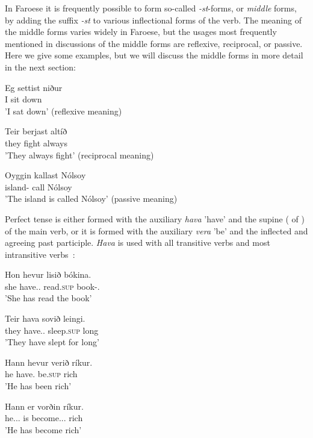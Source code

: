 \documentclass[12pt,%
]{lin-v2/lin}
\begin{document}
In Faroese it is frequently possible to form so-called \emph{-st}-forms, or \emph{middle} forms, by adding the suffix
\emph{-st} to various inflectional forms of the verb. The meaning of the middle forms varies widely in Faroese, but
the usages most frequently mentioned in discussions of the middle forms are reflexive, reciprocal, or passive.
Here we give some examples, but we will discuss the middle forms in more detail in the next section:
\begin{exe}
    \ex
    \begin{xlist}
        \item \gll Eg settist niður\\
        I sit down\\
        \trans 'I sat down' (reflexive meaning)
        \item \gll Teir berjast altíð\\
        they fight always\\
        \trans 'They always fight' (reciprocal meaning)
        \item \gll Oyggin kallast Nólsoy\\
        island-\Det{} call Nólsoy\\
        \trans 'The island is called Nólsoy' (passive meaning)
    \end{xlist}
\end{exe}

Perfect tense is either formed with the auxiliary \emph{hava} 'have' and the supine (\Sg\N{} of \Pst\Ptcp{}) of the main verb,
or it is formed with the auxiliary \emph{vera} 'be' and the inflected and agreeing past participle. \emph{Hava} is used
with all transitive verbs and most intransitive verbs~\citep[72]{faroese}:
\begin{exe}
    \ex
    \begin{xlist}
        \item \gll Hon hevur lisið bókina.\\
        she have.\Third\Sg.\Pst{} read.\textsc{sup} book-\Det.\Acc\\
        \trans 'She has read the book'
        \item \gll Teir hava sovið leingi.\\
        they have.\Third\Pl.\Pst{} sleep.\textsc{sup} long\\
        \trans 'They have slept for long'
        \item \gll Hann hevur verið ríkur.\\
        he have\Third\Sg.\Pst{} be.\textsc{sup} rich\\
        \trans 'He has been rich'
        \item \gll Hann er vorðin ríkur.\\
        he.\Nom.\Sg.\M{} is become.\Nom.\Sg.\M{} rich\\
        \trans 'He has become rich'
    \end{xlist}
\end{exe}
\end{document}
